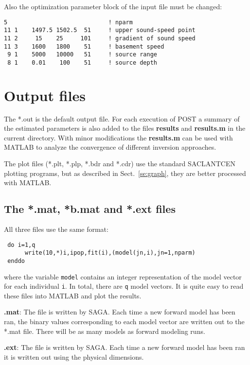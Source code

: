 \documentclass{saclantc}
\begin{document}
Also the optimization parameter block of the input file must be changed:
\small
\begin{verbatim}
5                             ! nparm
11 1    1497.5 1502.5  51     ! upper sound-speed point
11 2     15    25     101     ! gradient of sound speed
11 3    1600   1800    51     ! basement speed
 9 1    5000   10000   51     ! source range
 8 1    0.01    100    51     ! source depth 

\end{verbatim}
\normalsize

\section{Output files}
The *.out is the default output file.  For each execution of {\sf
POST} a summary of the estimated
parameters is also added to the files   {\bf results} and  {\bf results.m}
in the current directory. With minor modifications the {\bf results.m}
can be used with MATLAB to analyze the convergence of different
inversion approaches.

The plot files (*.plt, *.plp, *.bdr and *.cdr) use the standard SACLANTCEN
plotting programs, but as described in Sect.\ \ref{se:graph}, they are
better processed with MATLAB.

\subsection{The *.mat, *b.mat and *.ext files}

All three files  use the same format:
\small
\begin{verbatim}  
 do i=1,q
      write(10,*)i,ipop,fit(i),(model(jn,i),jn=1,nparm)
 enddo
\end{verbatim}
\normalsize
where the variable {\tt model} contains an integer representation of
the model vector for each individual {\tt i}.
In total, there are {\tt q} model vectors.
It is quite easy to read these files into MATLAB and plot the results.

{\bf *.mat}: The file is written by  {\sf SAGA}. 
Each time a new forward model has been ran,  the binary values
corresponding to each 
model vector are  written out 
to the  *.mat file.    
There will be as many models as forward modeling runs.

{\bf *.ext}: The file is written by  {\sf SAGA}.  
Each time a new forward model has been ran  it is 
written out using the physical dimensions. 
\end{document}
